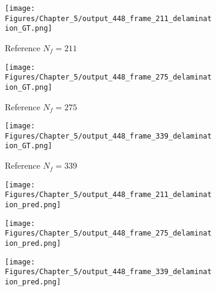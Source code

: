 \begin{figure} [!ht]
	\centering
	\begin{subfigure}[b]{.32\textwidth}
		\centering
		\texttt{[image: Figures/Chapter\_5/output\_448\_frame\_211\_delamination\_GT.png]}
		\caption{Reference $N_f=211$}
		\label{fig:ref_448_damage_211}
	\end{subfigure}
	\hfill
	\begin{subfigure}[b]{.32\textwidth}
		\centering
		\texttt{[image: Figures/Chapter\_5/output\_448\_frame\_275\_delamination\_GT.png]}
		\caption{Reference $N_f=275$}
		\label{fig:ref_448_damage_275}
	\end{subfigure}
	\hfill
	\begin{subfigure}[b]{.32\textwidth}
		\centering
		\texttt{[image: Figures/Chapter\_5/output\_448\_frame\_339\_delamination\_GT.png]}
		\caption{Reference $N_f=339$}
		\label{fig:ref_448_damage_339}	
	\end{subfigure}
	\hfill
	\begin{subfigure}[b]{.32\textwidth}
		\centering
		\texttt{[image: Figures/Chapter\_5/output\_448\_frame\_211\_delamination\_pred.png]}
		\caption{}
		\label{fig:pred_448_damage_211}
	\end{subfigure}
	\hfill
	\begin{subfigure}[b]{.32\textwidth}
		\centering
		\texttt{[image: Figures/Chapter\_5/output\_448\_frame\_275\_delamination\_pred.png]}
		\caption{}
		\label{fig:pred_448_damage_275}
	\end{subfigure}
	\hfill
	\begin{subfigure}[b]{.32\textwidth}
		\centering
		\texttt{[image: Figures/Chapter\_5/output\_448\_frame\_339\_delamination\_pred.png]}
		\caption{}
		\label{fig:pred_448_damage_339}	
	\end{subfigure}
	\caption{}
	\label{fig:num_results_CS_damage_area_448}
\end{figure}

